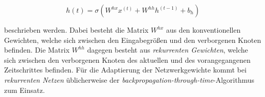 \begin{equation}
h(t) = \sigma(W^{hx}x^{(t)} + W^{hh}h^{(t-1)} + b_h)
\end{equation}

beschrieben werden. Dabei besteht die Matrix $W^{hx}$ aus den konventionellen Gewichten, welche sich zwischen den Eingabegrößen und den verborgenen Knoten befinden. Die Matrix $W^{hh}$ dagegen besteht aus \textit{rekurrenten Gewichten}, welche sich zwischen den verborgenen Knoten des aktuellen und des vorangegangenen Zeitschrittes befinden. Für die Adaptierung der Netzwerkgewichte kommt bei \textit{rekurrenten Netzen} üblicherweise der \textit{backpropagation-through-time}-Algorithmus zum Einsatz. \cite{Lipton.5292015}












 


 
